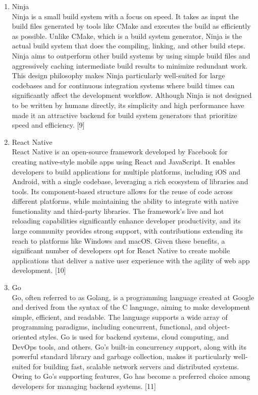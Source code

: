 \documentclass[conference]{IEEEtran}
\begin{document}
\begin{enumerate}[label=\arabic*.]
\begin{enumerate}[label=\alph*.]
\item Ninja\\
Ninja is a small build system with a focus on speed. It takes as input the build files generated by tools like CMake and executes the build as efficiently as possible. Unlike CMake, which is a build system generator, Ninja is the actual build system that does the compiling, linking, and other build steps. Ninja aims to outperform other build systems by using simple build files and aggressively caching intermediate build results to minimize redundant work. This design philosophy makes Ninja particularly well-suited for large codebases and for continuous integration systems where build times can significantly affect the development workflow. Although Ninja is not designed to be written by humans directly, its simplicity and high performance have made it an attractive backend for build system generators that prioritize speed and efficiency. [9]\\
\item React Native\\
React Native is an open-source framework developed by Facebook for creating native-style mobile apps using React and JavaScript. It enables developers to build applications for multiple platforms, including iOS and Android, with a single codebase, leveraging a rich ecosystem of libraries and tools. Its component-based structure allows for the reuse of code across different platforms, while maintaining the ability to integrate with native functionality and third-party libraries. The framework's live and hot reloading capabilities significantly enhance developer productivity, and its large community provides strong support, with contributions extending its reach to platforms like Windows and macOS. Given these benefits, a significant number of developers opt for React Native to create mobile applications that deliver a native user experience with the agility of web app development. [10]\\
\item Go\\
Go, often referred to as Golang, is a programming language created at Google and derived from the syntax of the C language, aiming to make development simple, efficient, and readable. The language supports a wide array of programming paradigms, including concurrent, functional, and object-oriented styles. Go is used for backend systems, cloud computing, and DevOps tools, and others. Go's built-in concurrency support, along with its powerful standard library and garbage collection, makes it particularly well-suited for building fast, scalable network servers and distributed systems. Owing to Go’s supporting features, Go has become a preferred choice among developers for managing backend systems. [11]\\
\end{enumerate}
\end{enumerate}
\end{document}
